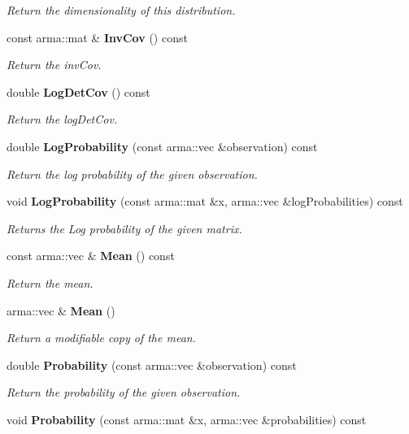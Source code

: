 \begin{DoxyCompactItemize}
\begin{DoxyCompactList}\small\item\em Return the dimensionality of this distribution. \end{DoxyCompactList}\item 
const arma\+::mat \& \textbf{ Inv\+Cov} () const
\begin{DoxyCompactList}\small\item\em Return the inv\+Cov. \end{DoxyCompactList}\item 
double \textbf{ Log\+Det\+Cov} () const
\begin{DoxyCompactList}\small\item\em Return the log\+Det\+Cov. \end{DoxyCompactList}\item 
double \textbf{ Log\+Probability} (const arma\+::vec \&observation) const
\begin{DoxyCompactList}\small\item\em Return the log probability of the given observation. \end{DoxyCompactList}\item 
void \textbf{ Log\+Probability} (const arma\+::mat \&x, arma\+::vec \&log\+Probabilities) const
\begin{DoxyCompactList}\small\item\em Returns the Log probability of the given matrix. \end{DoxyCompactList}\item 
const arma\+::vec \& \textbf{ Mean} () const
\begin{DoxyCompactList}\small\item\em Return the mean. \end{DoxyCompactList}\item 
arma\+::vec \& \textbf{ Mean} ()
\begin{DoxyCompactList}\small\item\em Return a modifiable copy of the mean. \end{DoxyCompactList}\item 
double \textbf{ Probability} (const arma\+::vec \&observation) const
\begin{DoxyCompactList}\small\item\em Return the probability of the given observation. \end{DoxyCompactList}\item 
void \textbf{ Probability} (const arma\+::mat \&x, arma\+::vec \&probabilities) const

\end{DoxyCompactItemize}

